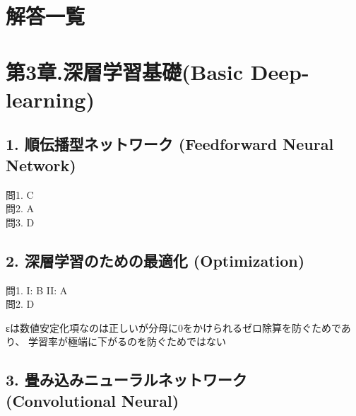 \documentclass[
  letterpaper,
  DIV=11,
  numbers=noendperiod]{scrreprt}
\begin{document}

\chapter{解答一覧}\label{ux89e3ux7b54ux4e00ux89a7}


\chapter{第3章.深層学習基礎(Basic
Deep-learning)}\label{ux7b2c3ux7ae0.ux6df1ux5c64ux5b66ux7fd2ux57faux790ebasic-deep-learning}

\section{1. 順伝播型ネットワーク (Feedforward Neural
Network)}\label{ux9806ux4f1dux64adux578bux30cdux30c3ux30c8ux30efux30fcux30af-feedforward-neural-network-1}

問1. C\\
問2. A\\
問3. D

\section{2. 深層学習のための最適化
(Optimization)}\label{ux6df1ux5c64ux5b66ux7fd2ux306eux305fux3081ux306eux6700ux9069ux5316-optimization-1}

問1. I: B II: A\\
問2. D

\begin{tcolorbox}[enhanced jigsaw, opacitybacktitle=0.6, colbacktitle=quarto-callout-note-color!10!white, breakable, colframe=quarto-callout-note-color-frame, coltitle=black, colback=white, titlerule=0mm, rightrule=.15mm, title=\textcolor{quarto-callout-note-color}{\faInfo}\hspace{0.5em}{解説}, arc=.35mm, left=2mm, leftrule=.75mm, bottomtitle=1mm, bottomrule=.15mm, toptitle=1mm, toprule=.15mm, opacityback=0]

εは数値安定化項なのは正しいが分母に0をかけられるゼロ除算を防ぐためであり、
学習率が極端に下がるのを防ぐためではない

\end{tcolorbox}

\section{3. 畳み込みニューラルネットワーク (Convolutional
Neural)}\label{ux7573ux307fux8fbcux307fux30cbux30e5ux30fcux30e9ux30ebux30cdux30c3ux30c8ux30efux30fcux30af-convolutional-neural-1}
\end{document}
